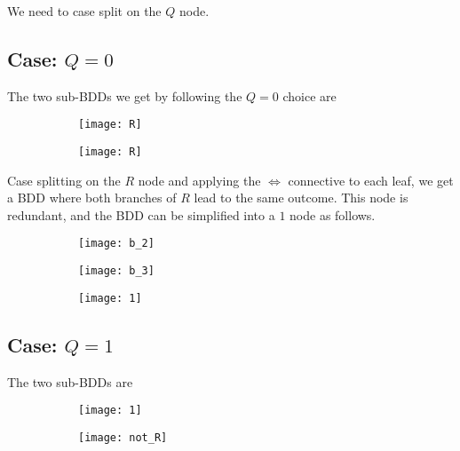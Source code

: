 \documentclass[11pt]{article}
\begin{document}
We need to case split on the $Q$ node.

\pagebreak

\subsection{Case: $Q=0$}

The two sub-BDDs we get by following the $Q=0$ choice are

\begin{figure}[H]
  \centering
  \begin{subfigure}{0.49\textwidth}
    \centering
    \texttt{[image: R]}
  \end{subfigure}
  \begin{subfigure}{0.49\textwidth}
    \centering
    \texttt{[image: R]}
  \end{subfigure}
\end{figure}

Case splitting on the $R$ node and applying the $\iff$ connective to each leaf, we get a BDD where both branches of $R$ lead to the same outcome. This node is redundant, and the BDD can be simplified into a $1$ node as follows.

\begin{figure}[H]
  \centering
  \begin{subfigure}{0.3\textwidth}
    \centering
    \texttt{[image: b\_2]}
  \end{subfigure}
  \begin{subfigure}{0.3\textwidth}
    \centering
    \texttt{[image: b\_3]}
  \end{subfigure}
  \begin{subfigure}{0.3\textwidth}
    \centering
    \texttt{[image: 1]}
  \end{subfigure}
\end{figure}

\pagebreak

\subsection{Case: $Q=1$}

The two sub-BDDs are

\begin{figure}[H]
  \centering
  \begin{subfigure}{0.49\textwidth}
    \centering
    \texttt{[image: 1]}
  \end{subfigure}
  \begin{subfigure}{0.49\textwidth}
    \centering
    \texttt{[image: not\_R]}
  \end{subfigure}
\end{figure}
\end{document}
